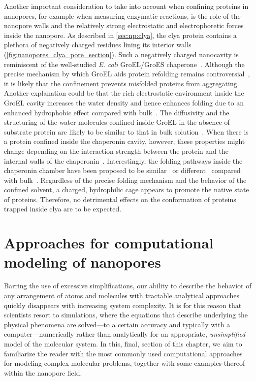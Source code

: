 Another important consideration to take into account when confining proteins in nanopores, for example when
measuring enzymatic reactions, is the role of the nanopore walls and the relatively strong electrostatic and
electrophoretic forces inside the nanopore. As described in \cref{sec:np:clya}, the \gls{clya} protein
contains a plethora of negatively charged residues lining its interior walls
(\cref{fig:nanopores_clya_pore_section}). Such a negatively charged nanocavity is reminiscent of the
well-studied \textit{E. coli} {GroEL/GroES} chaperone~\cite{Xu-1997}. Although the precise mechanism by which
{GroEL} aids protein refolding remains
controversial~\cite{England-2008,England-2008b,Motojima-2012,Weber-2013}, it is likely that the confinement
prevents misfolded proteins from aggregating. Another explanation could be that the rich electrostatic
environment inside the {GroEL} cavity increases the water density and hence enhances folding due to an
enhanced hydrophobic effect compared with bulk~\cite{England-2008,England-2008b}. The diffusivity and the
structuring of the water molecules confined inside {GroEL} in the absence of substrate protein are likely to
be similar to that in bulk solution~\cite{Franck-2014}. When there is a protein confined inside the chaperonin
cavity, however, these properties might change depending on the interaction strength between the protein and
the internal walls of the chaperonin~\cite{Weber-2013}. Interestingly, the folding pathways inside the
chaperonin chamber have been proposed to be similar~\cite{Horst-2007} or different~\cite{Jewett-2004} compared
with bulk~\cite{Apetri-2008}. Regardless of the precise folding mechanism and the behavior of the confined
solvent, a charged, hydrophilic cage appears to promote the native state of proteins. Therefore, no
detrimental effects on the conformation of proteins trapped inside \gls{clya} are to be expected.


%
%
%
%


\section{Approaches for computational modeling of nanopores}
%
\label{sec:np:modeling}
%

Barring the use of excessive simplifications, our ability to describe the behavior of any arrangement of atoms
and molecules with tractable analytical approaches quickly disappears with increasing system complexity. It is
for this reason that scientists resort to simulations, where the equations that describe underlying the
physical phenomena are solved---to a certain accuracy and typically with a computer---numerically rather than
analytically for an appropriate, \emph{unsimplified} model of the molecular system. In this, final, section of
this chapter, we aim to familiarize the reader with the most commonly used computational approaches for
modeling complex molecular problems, together with some examples thereof within the nanopore field.

